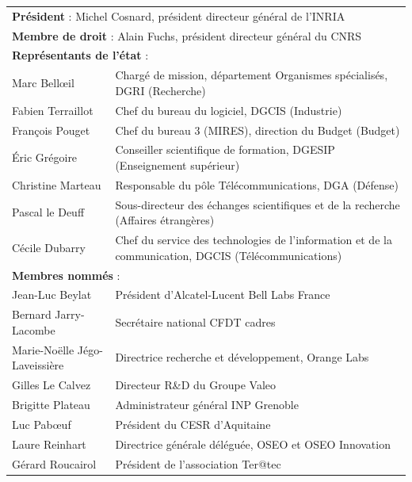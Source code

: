       \begin{tabular}{|l|p{8cm}|}
    \multicolumn{2}{l}{\textbf{Président} : Michel Cosnard, président directeur général de
    l'INRIA} \\
    \multicolumn{2}{l}{\textbf{Membre de droit} : Alain Fuchs, président directeur général
    du CNRS} \\
        \multicolumn{2}{l}{\textbf{Représentants de l'état} :} \\
        \hline
        Marc Bellœil &
        Chargé de mission, département Organismes spécialisés, DGRI (Recherche) \\
        \hline
        Fabien Terraillot & Chef du bureau du logiciel, DGCIS (Industrie) \\
        François Pouget & Chef du bureau 3 (MIRES), direction du Budget (Budget) \\
        \hline
        Éric Grégoire &
        Conseiller scientifique de formation, DGESIP (Enseignement supérieur) \\
        \hline
        Christine Marteau & Responsable du pôle Télécommunications, DGA (Défense) \\
        \hline
        Pascal le Deuff &
        Sous-directeur des échanges scientifiques et de la recherche (Affaires étrangères) \\
        \hline
        Cécile Dubarry &
        Chef du service des technologies de l’information et de la communication, DGCIS (Télécommunications) \\
        \hline
        \multicolumn{2}{l}{\textbf{Membres nommés} :}\\
        \hline
        Jean-Luc Beylat & Président d’Alcatel-Lucent Bell Labs France \\
        \hline
        Bernard Jarry-Lacombe & Secrétaire national CFDT cadres \\
        \hline
        Marie-Noëlle Jégo-Laveissière & Directrice recherche et développement,
        Orange Labs \\
        \hline
        Gilles Le Calvez & Directeur R\&D du Groupe Valeo \\
        \hline
        Brigitte Plateau & Administrateur général INP Grenoble \\
        \hline
        Luc Pabœuf & Président du CESR d’Aquitaine \\
        \hline
        Laure Reinhart & Directrice générale déléguée, OSEO et OSEO Innovation \\
        \hline
        Gérard Roucairol & Président de l’association Ter@tec \\

\end{tabular}
